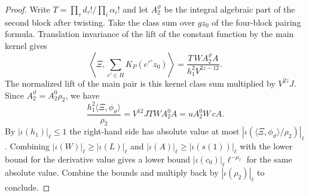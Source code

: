 \begin{proof}
Write $T=\prod_\tau d_\tau!/\prod_i\alpha_i!$ and let $A_2^\vartheta$ be the integral algebraic part of the second block after twisting. Take the class sum over $g z_0$ of the four-block pairing formula. Translation invariance of the lift of the constant function by the main kernel gives
\[
 \left\langle\Xi,\sum_{c'\in H}K_P(c'^\circ z_0)\right\rangle
 =\frac{T\,W A_2^\vartheta A}{h_1^2V^{2z-12}}.
\]
The normalized lift of the main pair is this kernel class sum multiplied by $V^{2z}J$. Since $A_2^\vartheta=A_2^0\rho_2$, we have
\[
 \frac{h_1^2\langle\Xi,\phi_\vartheta\rangle}{\rho_2}
 =V^{12}JTWA_2^0 A=u A_2^0 W\,c A .
\]
By $|\iota(h_1)|_\ell\le1$ the right-hand side has absolute value at most $|\iota(\langle\Xi,\phi_\vartheta\rangle/\rho_2)|_\ell$. Combining $|\iota(W)|_\ell\ge|\iota(L)|_\ell$ and $|\iota(A)|_\ell\ge|\iota(s(1))|_\ell$ with the lower bound for the derivative value gives a lower bound $|\iota(c_0)|_\ell\ell^{-\mu_\ell}$ for the same absolute value. Combine the bounds and multiply back by $|\iota(\rho_2)|_\ell$ to conclude.
\end{proof}

